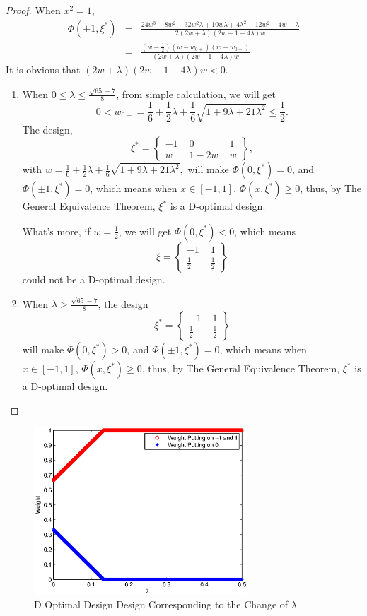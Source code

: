 \documentclass[preprint,12pt]{elsarticle}
\begin{document}
\begin{proof}
When $x^2=1$,
\begin{eqnarray*}
\Phi(\pm1,\xi^*)&=&\frac{24w^3-8w^2-32w^2\lambda+10w\lambda+4\lambda^2-12w^2+4w+\lambda}{2(2w+\lambda)(2w-1-4\lambda)w}\\
&=&\frac{(w-\frac{1}{2})(w-w_{0+})(w-w_{0-})}{(2w+\lambda)(2w-1-4\lambda)w}
\end{eqnarray*}
It is obvious that $(2w+\lambda)(2w-1-4\lambda)w<0$.

\begin{enumerate}
\item When $0\leq\lambda\leq\frac{\sqrt{65}-7}{8}$, from simple
calculation, we will get
$$0<w_{0+}=\frac{1}{6}+\frac{1}{2}\lambda+\frac{1}{6}\sqrt{1+9\lambda+21\lambda^2}\leq\frac{1}{2}.$$
The design,
$$\xi^*=\left\{\begin{array}{ccc}-1\,\,&0\,\,&1\\w\,\,&1-2w\,\,&w\end{array}\right\},$$
with
$w=\frac{1}{6}+\frac{1}{2}\lambda+\frac{1}{6}\sqrt{1+9\lambda+21\lambda^2},$
will make $\Phi(0,\xi^*)=0$, and $\Phi(\pm1,\xi^*)=0$, which means
when $x\in[-1,1]$, $\Phi(x,\xi^*)\geq0$, thus, by The General
Equivalence Theorem, $\xi^*$ is a D-optimal design.

What's more, if $w=\frac{1}{2}$, we will get $\Phi(0,\xi^*)<0$,
which means $$\xi=\left\{\begin{array}{ccc}-1\,\,&1\\
\frac{1}{2}\,\,&\frac{1}{2}\end{array}\right\}$$ could not be a
D-optimal design.

\item When $\lambda>\frac{\sqrt{65}-7}{8}$, the design
$$\xi^*=\left\{\begin{array}{ccc}-1\,\,&1\\ \frac{1}{2}\,\,&\frac{1}{2}\end{array}\right\}$$
will make $\Phi(0,\xi^*)>0$, and $\Phi(\pm1,\xi^*)=0$, which means
when $x\in[-1,1]$, $\Phi(x,\xi^*)\geq0$, thus, by The General
Equivalence Theorem, $\xi^*$ is a D-optimal design.
\end{enumerate}
\end{proof}

\begin{figure}[htpb]
\begin{center}
\includegraphics[width=8cm]{Dopt.eps}
\caption{\label{fig:DoptS} D Optimal Design Design Corresponding to
the Change of $\lambda$ }
\end{center}
\end{figure}
\end{document}
